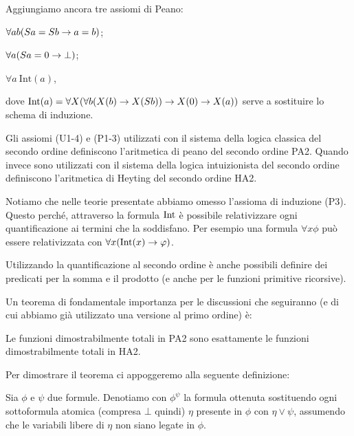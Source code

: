 \documentclass[]{marticle}
\begin{document}
Aggiungiamo ancora tre assiomi di Peano:
\begin{nlist}[P1]
    \item $\forall ab(Sa =Sb \rightarrow a = b)$;
    \item $\forall a(Sa=0 \rightarrow \bot)$;
    \item $\forall a\ \text{Int}(a)$,
\end{nlist}
dove $\text{Int}(a) = \forall X(\forall b (X(b)\rightarrow X(Sb)) \rightarrow X(0) \rightarrow X(a))$
serve a sostituire lo schema di induzione.

\begin{block}[Definizione]
    Gli assiomi (U1-4) e (P1-3) utilizzati con il sistema della logica classica
    del secondo ordine definiscono l'aritmetica di peano del secondo ordine PA2.
    Quando invece sono utilizzati con il sistema della logica intuizionista del
    secondo ordine definiscono l'aritmetica di Heyting del secondo ordine HA2.
\end{block}

Notiamo che nelle teorie presentate abbiamo omesso l'assioma di induzione (P3).
Questo perch\'e, attraverso la formula $\text{Int}$ \`e possibile relativizzare ogni
quantificazione ai termini che la soddisfano. Per esempio una formula $\forall x
\phi$ pu\`o essere relativizzata con $\forall x (\text{Int}(x)\rightarrow \varphi)$.

Utilizzando la quantificazione al secondo ordine \`e anche possibili definire
dei predicati per la somma e il prodotto (e anche per le funzioni primitive
ricorsive).

Un teorema di fondamentale importanza per le discussioni che seguiranno (e di
cui abbiamo gi\`a utilizzato una versione al primo ordine) \`e:
\begin{block}[Teorema]
    Le funzioni dimostrabilmente totali in PA2 sono esattamente le funzioni
    dimostrabilmente totali in HA2.
\end{block}

Per dimostrare il teorema ci appoggeremo alla seguente definizione:
\begin{block}[Definizione]
    Sia $\phi$ e $\psi$ due formule. Denotiamo con $\phi^\psi$ la formula
    ottenuta sostituendo ogni sottoformula atomica (compresa $\bot$ quindi)
    $\eta$ presente in $\phi$ con $\eta\lor\psi$, assumendo che le variabili
    libere di $\eta$ non siano legate in $\phi$.
\end{block}
\end{document}
